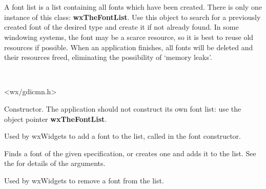 \section{}\label{wxfontlist}

A font list is a list containing all fonts which have been created. There
is only one instance of this class: {\bf wxTheFontList}.  Use this object to search
for a previously created font of the desired type and create it if not already found.
In some windowing systems, the font may be a scarce resource, so it is best to
reuse old resources if possible.  When an application finishes, all fonts will be
deleted and their resources freed, eliminating the possibility of `memory leaks'.


\\


<wx/gdicmn.h>






Constructor. The application should not construct its own font list:
use the object pointer {\bf wxTheFontList}.



Used by wxWidgets to add a font to the list, called in the font constructor.

\label{findorcreatefont}


Finds a font of the given specification, or creates one and adds it to the list. See the  for
details of the arguments.



Used by wxWidgets to remove a font from the list.


